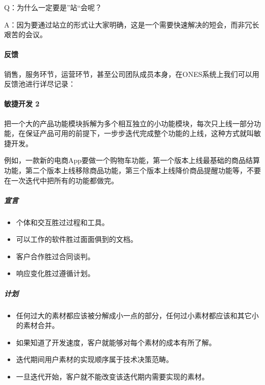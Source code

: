 \documentclass[letterpaper,10pt,english]{sphinxmanual}
\begin{document}
Q：为什么一定要是”站“会呢？

A：因为要通过站立的形式让大家明确，这是一个需要快速解决的短会，而非冗长艰苦的会议。


\paragraph{反馈}
\label{\detokenize{chapter_project/Scrum:id10}}
销售，服务环节，运营环节，甚至公司团队成员本身，在ONES系统上我们可以用反馈池进行详尽记录：


\paragraph{敏捷开发 2\sphinxfootnotemark[818]}
\label{\detokenize{chapter_project/Scrum:id11}}%
\begin{footnotetext}[818]\sphinxAtStartFootnote
{}
%
\end{footnotetext}\ignorespaces 
把一个大的产品功能模块拆解为多个相互独立的小功能模块，每次只上线一部分功能，在保证产品可用的前提下，一步步迭代完成整个功能的上线，这种方式就叫敏捷开发。
%
\begin{footnote}[819]\sphinxAtStartFootnote
{}
%
\end{footnote}

例如，一款新的电商App要做一个购物车功能，第一个版本上线最基础的商品结算功能，第二个版本上线移除商品功能，第三个版本上线降价商品提醒功能等，不要在一次迭代中把所有的功能都做完。


\subparagraph{宣言}
\label{\detokenize{chapter_project/Scrum:id12}}\begin{itemize}
\item {} 
个体和交互胜过过程和工具。

\item {} 
可以工作的软件胜过面面俱到的文档。

\item {} 
客户合作胜过合同谈判。

\item {} 
响应变化胜过遵循计划。

\end{itemize}


\subparagraph{计划}
\label{\detokenize{chapter_project/Scrum:id13}}\begin{itemize}
\item {} 
任何过大的素材都应该被分解成小一点的部分，任何过小素材都应该和其它小的素材合并。

\item {} 
如果知道了开发速度，客户就能够对每个素材的成本有所了解。

\item {} 
迭代期间用户素材的实现顺序属于技术决策范畴。

\item {} 
一旦迭代开始，客户就不能改变该迭代期内需要实现的素材。

\end{itemize}
\end{document}
